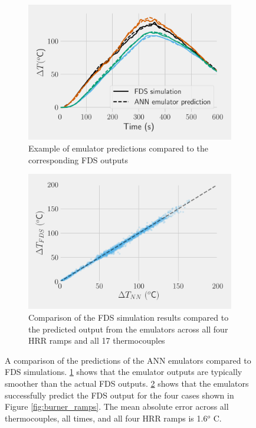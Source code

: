 \documentclass{article}
\begin{document}
\begin{figure}[htbp]
  \centering
  \begin{subfigure}[t]{.45\textwidth}
      \centering
      \includegraphics[width=\textwidth,keepaspectratio]{figures/forward_NN_examples.pdf}
      \caption{Example of emulator predictions compared to the corresponding FDS outputs}
      \label{fig:forward_NN_examples}
  \end{subfigure}
  \begin{subfigure}[t]{.45\textwidth}
      \centering
      \includegraphics[width=\textwidth ,keepaspectratio]{figures/forward_error_scatter.pdf}
      \caption{Comparison of the FDS simulation results compared to the predicted output from the emulators across all four HRR ramps and all 17 thermocouples }
      \label{fig:forward_error_scatter}
  \end{subfigure}
  \caption{A comparison of the predictions of the ANN emulators compared to FDS simulations. \protect\ref{fig:forward_NN_examples} shows that the emulator outputs are typically smoother than the actual FDS outputs. \protect\ref{fig:forward_error_scatter} shows that the emulators successfully predict the FDS output for the four cases shown in Figure \protect\ref{fig:burner_ramps}. The mean absolute error across all thermocouples, all times, and all four HRR ramps is 1.6$^o$ C.}
  \label{fig:forward_error}
\end{figure}
\end{document}
